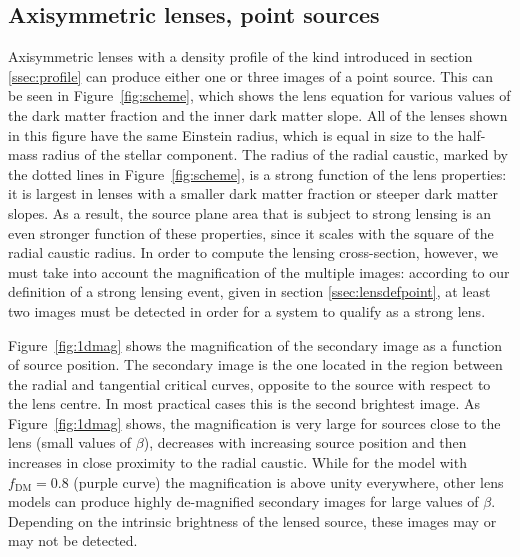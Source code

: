 \documentclass{aa}
\def\crosssect{\sigma_\mathrm{{SL}}}
\def\Fref#1{Figure~\ref{#1}\xspace}
\begin{document}
\subsection{Axisymmetric lenses, point sources}\label{ssec:axsymmpoint}

Axisymmetric lenses with a density profile of the kind introduced in section \ref{ssec:profile} can produce either one or three images of a point source.
This can be seen in \Fref{fig:scheme}, which shows the lens equation for various values of the dark matter fraction and the inner dark matter slope.
All of the lenses shown in this figure have the same Einstein radius, which is equal in size to the half-mass radius of the stellar component.
The radius of the radial caustic, marked by the dotted lines in \Fref{fig:scheme}, is a strong function of the lens properties: it is largest in lenses with a smaller dark matter fraction or steeper dark matter slopes.
As a result, the source plane area that is subject to strong lensing is an even stronger function of these properties, since it scales with the square of the radial caustic radius.
In order to compute the lensing cross-section, however, we must take into account the magnification of the multiple images: according to our definition of a strong lensing event, given in section \ref{ssec:lensdefpoint}, at least two images must be detected in order for a system to qualify as a strong lens.

\Fref{fig:1dmag} shows the magnification of the secondary image as a function of source position. The secondary image is the one located in the region between the radial and tangential critical curves, opposite to the source with respect to the lens centre. In most practical cases this is the second brightest image.
As \Fref{fig:1dmag} shows, the magnification is very large for sources close to the lens (small values of $\beta$), decreases with increasing source position and then increases in close proximity to the radial caustic.
While for the model with $f_{\mathrm{DM}}=0.8$ (purple curve) the magnification is above unity everywhere, other lens models can produce highly de-magnified secondary images for large values of $\beta$.
Depending on the intrinsic brightness of the lensed source, these images may or may not be detected.
\end{document}
